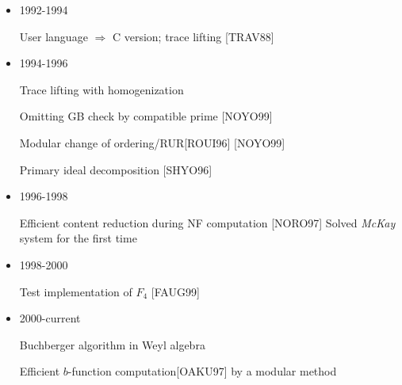 \begin{slide}{}

\begin{itemize}
\item 1992-1994

User language $\Rightarrow$ C version; trace lifting [TRAV88]

\item 1994-1996

Trace lifting with homogenization

Omitting GB check by compatible prime [NOYO99]

Modular change of ordering/RUR[ROUI96] [NOYO99]

Primary ideal decomposition [SHYO96]

\item 1996-1998

Efficient content reduction during NF computation [NORO97]
Solved {\it McKay} system for the first time

\item 1998-2000

Test implementation of $F_4$ [FAUG99]

\item 2000-current

Buchberger algorithm in Weyl algebra

Efficient $b$-function computation[OAKU97] by a modular method
\end{itemize}
\end{slide}

